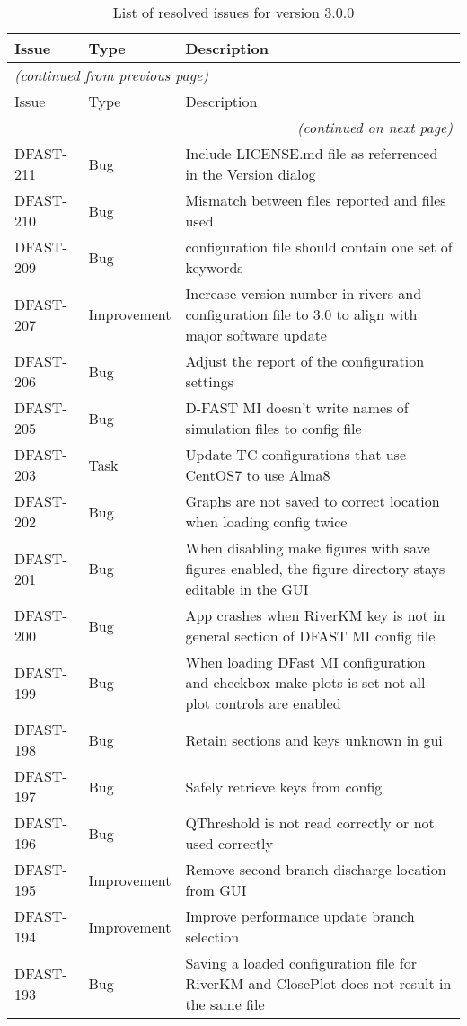 \documentclass[git]{deltares_manual}
\begin{document}
\begin{longtable}{l|l|p{8cm}}
\caption{List of resolved issues for version 3.0.0} \\
Issue & Type & Description \\ \hline
\endfirsthead
\multicolumn{3}{l}{\textsl{(continued from previous page)}} \\
Issue & Type & Description \\ \hline
\endhead
\hline \multicolumn{3}{r}{\textsl{(continued on next page)}} \\
\endfoot
\endlastfoot 
DFAST-211 & Bug & Include LICENSE.md file as referrenced in the Version dialog \\
DFAST-210 & Bug & Mismatch between files reported and files used \\
DFAST-209 & Bug & configuration file should contain one set of keywords \\
DFAST-207 & Improvement & Increase version number in rivers and configuration file to 3.0 to align with major software update \\
DFAST-206 & Bug & Adjust the report of the configuration settings \\
DFAST-205 & Bug & D-FAST MI doesn't write names of simulation files to config file \\
DFAST-203 & Task & Update TC configurations that use CentOS7 to use Alma8 \\
DFAST-202 & Bug & Graphs are not saved to correct location when loading config twice \\
DFAST-201 & Bug & When disabling make figures with save figures enabled, the figure directory stays editable in the GUI \\
DFAST-200 & Bug & App crashes when RiverKM key is not in general section of DFAST MI config file \\
DFAST-199 & Bug & When loading DFast MI configuration and checkbox make plots is set not all plot controls are enabled \\
DFAST-198 & Bug & Retain sections and keys unknown in gui \\
DFAST-197 & Bug & Safely retrieve keys from config \\
DFAST-196 & Bug & QThreshold is not read correctly or not used correctly \\
DFAST-195 & Improvement & Remove second branch discharge location from GUI \\
DFAST-194 & Improvement & Improve performance update branch selection \\
DFAST-193 & Bug & Saving a loaded configuration file for RiverKM and ClosePlot does not result in the same file \\

\end{longtable}
\end{document}
